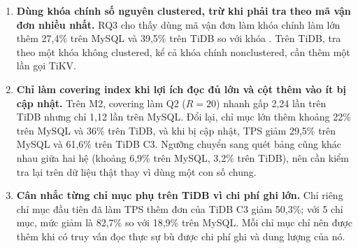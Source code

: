 \begin{enumerate}
  \item \textbf{Dùng khóa chính số nguyên clustered, trừ khi phải tra theo mã vận đơn nhiều nhất.} RQ3 cho thấy dùng mã vận đơn làm khóa chính làm  lớn thêm 27,4\% trên MySQL và 39,5\% trên TiDB so với khóa . Trên TiDB, tra theo một khóa không clustered, kể cả khóa chính nonclustered, cần thêm một lần gọi TiKV.

  \item \textbf{Chỉ làm covering index khi lợi ích đọc đủ lớn và cột thêm vào ít bị cập nhật.} Trên M2, covering làm Q2 ($R = 20$) nhanh gấp 2,24 lần trên TiDB nhưng chỉ 1,12 lần trên MySQL. Đổi lại, chỉ mục lớn thêm khoảng 22\% trên MySQL và 36\% trên TiDB, và khi  bị cập nhật, TPS giảm 29,5\% trên MySQL và 61,6\% trên TiDB C3. Ngưỡng chuyển sang quét bảng cũng khác nhau giữa hai hệ (khoảng 6,9\% trên MySQL, 3,2\% trên TiDB), nên cần kiểm tra lại trên dữ liệu thật thay vì dùng một con số chung.

  \item \textbf{Cân nhắc từng chỉ mục phụ trên TiDB vì chi phí ghi lớn.} Chỉ riêng chỉ mục đầu tiên đã làm TPS thêm đơn của TiDB C3 giảm 50,3\%; với 5 chỉ mục, mức giảm là 82,7\% so với 18,9\% trên MySQL. Mỗi chỉ mục chỉ nên được thêm khi có truy vấn đọc thực sự bù được chi phí ghi và dung lượng của nó.
\end{enumerate}
